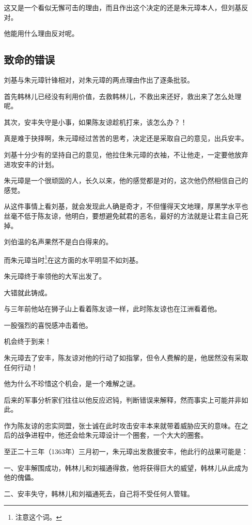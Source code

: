 \begin{multicols}{\theparacolNo}
		这又是一个看似无懈可击的理由，而且作出这个决定的还是朱元璋本人，但刘基反对。

		他能用什么理由反对呢。

		\subsection{致命的错误}
		刘基与朱元璋针锋相对，对朱元璋的两点理由作出了逐条批驳。

		首先韩林儿已经没有利用价值，去救韩林儿，不救出来还好，救出来了怎么处理呢。

		其次，安丰失守是小事，如果陈友谅趁机打来，该怎么办？！

		真是难于抉择啊，朱元璋经过苦苦的思考，决定还是采取自己的意见，出兵安丰。

		刘基十分少有的坚持自己的意见，他拉住朱元璋的衣袖，不让他走，一定要他放弃进攻安丰的计划。

		朱元璋是一个很顽固的人，长久以来，他的感觉都是对的，这次他仍然相信自己的感觉。

		从这件事情上看刘基，就会发现此人确是奇才，不但懂得天文地理，厚黑学水平也丝毫不低于陈友谅，他明白，要想避免弑君的恶名，最好的方法就是让君主自己死掉。

		刘伯温的名声果然不是白白得来的。

		而朱元璋当时\footnote{注意这个词。}在这方面的水平明显不如刘基。

		朱元璋终于率领他的大军出发了。

		大错就此铸成。

		与三年前他站在狮子山上看着陈友谅一样，此时陈友谅也在江洲看着他。

		一股强烈的喜悦感冲击着他。

		机会终于到来！

		朱元璋去了安丰，陈友谅对他的行动了如指掌，但令人费解的是，他居然没有采取任何行动！

		他为什么不珍惜这个机会，是一个难解之谜。

		后来的军事分析家们往往以他反应迟钝，判断错误来解释，然而事实上可能并非如此。

		作为陈友谅的忠实同盟，张士诚在此时攻击安丰本来就带着威胁应天的意味。在之后的战争进程中，他还会给朱元璋设计一个圈套，一个大大的圈套。

		至正二十三年（1363年）三月初一，朱元璋出发救援安丰，他此行的战果可能是：

		一、安丰解围成功，韩林儿和刘福通得救，他将获得巨大的威望，韩林儿从此成为他的傀儡。

		二、安丰失守，韩林儿和刘福通死去，自己将不受任何人管辖。


\end{multicols}
